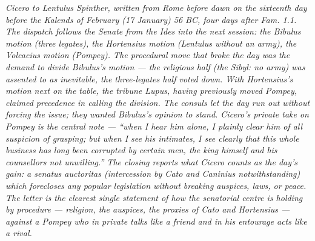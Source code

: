 
\textit{Cicero to Lentulus Spinther, written from Rome before
dawn on the sixteenth day before the Kalends of February
(17 January) 56 BC, four days after Fam. 1.1. The dispatch
follows the Senate from the Ides into the next session: the
Bibulus motion (three legates), the Hortensius motion (Lentulus
without an army), the Volcacius motion (Pompey). The procedural
move that broke the day was the demand to divide Bibulus's
motion --- the religious half (the Sibyl: no army) was assented
to as inevitable, the three-legates half voted down. With
Hortensius's motion next on the table, the tribune Lupus,
having previously moved Pompey, claimed precedence in calling
the division. The consuls let the day run out without forcing
the issue; they wanted Bibulus's opinion to stand. Cicero's
private take on Pompey is the central note --- ``when I hear
him alone, I plainly clear him of all suspicion of grasping;
but when I see his intimates, I see clearly that this whole
business has long been corrupted by certain men, the king
himself and his counsellors not unwilling.'' The closing
 reports what Cicero counts as the day's gain:
a senatus auctoritas (intercession by Cato and Caninius
notwithstanding) which forecloses any popular legislation
without breaking auspices, laws, or peace. The letter is the
clearest single statement of how the senatorial centre is
holding by procedure --- religion, the auspices, the proxies
of Cato and Hortensius --- against a Pompey who in private
talks like a friend and in his entourage acts like a rival.}
